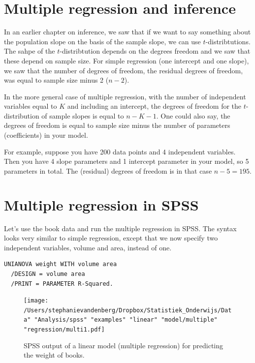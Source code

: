 \documentclass[]{report}\usepackage[]{graphicx}\usepackage[]{color}
\begin{document}
\section{Multiple regression and inference}

In an earlier chapter on inference, we saw that if we want to say something about the population slope on the basis of the sample slope, we can use $t$-distribtutions. The sahpe of the $t$-distribtution depends on the degrees freedom and we saw that these depend on sample size. For simple regression (one intercept and one slope), we saw that the number of degrees of freedom, the residual degrees of freedom, was equal to sample size minus 2 ($n-2$).

In the more general case of multiple regression, with the number of independent variables equal to $K$ and including an intercept, the degrees of freedom for the $t$-distribution of sample slopes is equal to $n-K-1$. One could also say, the degrees of freedom is equal to sample size minus the number of parameters (coefficients) in your model.

For example, suppose you have 200 data points and 4 independent variables. Then you have 4 slope parameters and 1 intercept parameter in your model, so 5 parameters in total. The (residual) degrees of freedom is in that case $n-5=195$.




\section{Multiple regression in SPSS}

Let's use the book data and run the multiple regression in SPSS. The syntax looks very similar to simple regression, except that we now specify two independent variables, volume and area, instead of one.

\begin{verbatim}
UNIANOVA weight WITH volume area
  /DESIGN = volume area
  /PRINT = PARAMETER R-Squared.
\end{verbatim}


\begin{figure}[h]
    \begin{center}
       \texttt{[image: /Users/stephanievandenberg/Dropbox/Statistiek\_Onderwijs/Data" "Analysis/spss" "examples" "linear" "model/multiple" "regression/multi1.pdf]}
    \end{center}
     \caption{SPSS output of a linear model (multiple regression) for predicting the weight of books.}
    \label{fig:multi1}
\end{figure}
\end{document}

